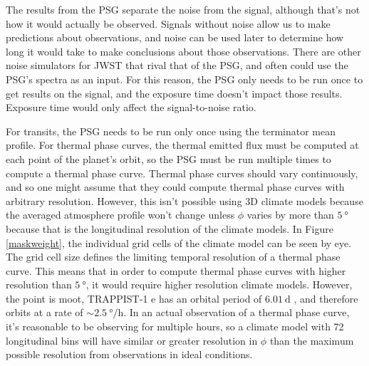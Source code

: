 The results from the PSG separate the noise from the signal, although that's not
 how it would actually be observed. Signals without noise allow us to make
 predictions about observations, and noise can be used later to determine how
 long it would take to make conclusions about those observations. There are
 other noise simulators for JWST that rival that of the PSG, and often
 could use the PSG's spectra as an input. For this reason, the PSG only needs
 to be run once to get results on the signal, and the exposure time doesn't
 impact those results. Exposure time would only affect the signal-to-noise
 ratio.

For transits, the PSG needs to be run only once using the terminator mean
 profile. For thermal phase curves, the thermal emitted flux must be computed at
 each point of the planet's orbit, so the PSG must be run multiple times to
 compute a thermal phase curve. Thermal phase curves should vary continuously,
 and so one might assume that they could compute thermal phase curves with
 arbitrary resolution. However, this isn't possible using 3D climate models because
 the averaged atmosphere profile won't change unless $\phi$ varies by more than
 $\SI{5}{\degree}$ because  that is the longitudinal resolution of the climate
 models. In Figure \ref{maskweight}, the individual grid cells of the climate
 model can be seen by eye. The grid cell size defines the limiting temporal
 resolution of a thermal phase curve. This means that in order to compute thermal
 phase curves with higher resolution than $\SI{5}{\degree}$, it would require higher
 resolution climate models. However, the point is moot, TRAPPIST-1 e has an
 orbital period of $\SI{6.01}{\day}$ \citep{trappistdiscovery}, and therefore orbits at a
 rate of $\sim\SI{2.5}{\degree\per\hour}$. In an actual observation of a
 thermal phase curve, it's reasonable to be observing for multiple hours, so a
 climate model with 72 longitudinal bins will have similar or greater resolution
 in $\phi$ than the maximum possible resolution from observations in ideal
 conditions.